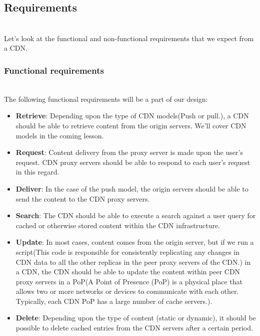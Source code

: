 \subsection{Requirements}\label{xyNU2oEDDs-sQs6AQ644g}
\\
Let's look at the functional and non-functional requirements that we expect from a CDN.

\subsubsection{Functional requirements}\label{X41Oi7-RStw7uCO5pyuH2}
\\
The following functional requirements will be a part of our design:

\begin{itemize}
\item
\protect{}\label{J5aoUhyyAKJ1c6F4yftxy}
\textbf{Retrieve}: Depending upon the type of CDN models(Push or pull.), a CDN should be able to retrieve content from the origin servers. We'll cover CDN models in the coming lesson.
\item
\protect{}\label{OOQ1jU5nCJQCTVgUYVkd-}
\textbf{Request}: Content delivery from the proxy server is made upon the user's request. CDN proxy servers should be able to respond to each user's request in this regard.
\item
\protect{}\label{eaNCvnKGiRWfrjHkCQoeA}
\textbf{Deliver}: In the case of the push model, the origin servers should be able to send the content to the CDN proxy servers.
\item
\protect{}\label{uTsh2TMmQOq-ebSRngx2W}
\textbf{Search}: The CDN should be able to execute a search against a user query for cached or otherwise stored content within the CDN infrastructure.
\item
\protect{}\label{cS-sZKq3Wx5HyUJU4tzRL}
\textbf{Update}: In most cases, content comes from the origin server, but if we run a script(This code is responsible for consistently replicating any changes in CDN data to all the other replicas in the peer proxy servers of the CDN.) in a CDN, the CDN should be able to update the content within peer CDN proxy servers in a PoP(A Point of Presence (PoP) is a physical place that allows two or more networks or devices to communicate with each other. Typically, each CDN PoP has a large number of cache servers.).
\item
\protect{}\label{P2zuNsPiBvEKlj0IKkrxo}
\textbf{Delete}: Depending upon the type of content (static or dynamic), it should be possible to delete cached entries from the CDN servers after a certain period.
\end{itemize}

